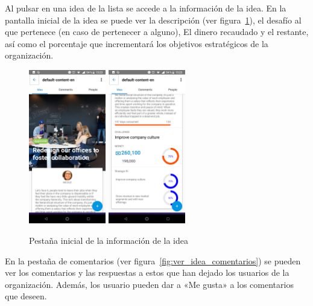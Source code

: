 Al pulsar en una idea de la lista se accede a la información de la idea. En la pantalla inicial 
de la idea se puede ver la descripción (ver figura~\ref{fig:ver_idea_inicio}), el desafío al que 
pertenece (en caso de pertenecer a alguno), El dinero recaudado y el restante, así como el porcentaje 
que incrementará los objetivos estratégicos de la organización.

\begin{figure}[!h]
	\begin{center}
		\includegraphics[width=0.3\textwidth]{./img/anexo1/ver_idea_inicio.png}
		\includegraphics[width=0.3\textwidth]{./img/anexo1/ver_idea_inicio_cont.png}
		\caption{Pestaña inicial de la información de la idea}
		\label{fig:ver_idea_inicio}
	\end{center}
\end{figure}

En la pestaña de comentarios (ver figura~\ref{fig:ver_idea_comentarios}) se pueden ver los comentarios 
y las respuestas a estos que han dejado los usuarios de la organización. Además, los usuario pueden 
dar a «Me gusta» a los comentarios que deseen.

